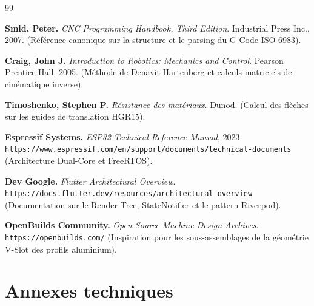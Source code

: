 
\newpage
{}
\begin{thebibliography}{99}

\textbf{Smid, Peter.} \textit{CNC Programming Handbook, Third Edition}. Industrial Press Inc., 2007. \newline
(Référence canonique sur la structure et le parsing du G-Code ISO 6983).

\textbf{Craig, John J.} \textit{Introduction to Robotics: Mechanics and Control}. Pearson Prentice Hall, 2005. \newline
(Méthode de Denavit-Hartenberg et calculs matriciels de cinématique inverse).

\textbf{Timoshenko, Stephen P.} \textit{Résistance des matériaux}. Dunod. \newline
(Calcul des flèches sur les guides de translation HGR15).

\textbf{Espressif Systems.} \textit{ESP32 Technical Reference Manual}, 2023. \newline
\texttt{https://www.espressif.com/en/support/documents/technical-documents} \newline
(Architecture Dual-Core et FreeRTOS).

\textbf{Dev Google.} \textit{Flutter Architectural Overview}. \newline
\texttt{https://docs.flutter.dev/resources/architectural-overview} \newline
(Documentation sur le Render Tree, StateNotifier et le pattern Riverpod).

\textbf{OpenBuilds Community.} \textit{Open Source Machine Design Archives}. \newline
\texttt{https://openbuilds.com/} \newline
(Inspiration pour les sous-assemblages de la géométrie V-Slot des profils aluminium).

\end{thebibliography}

\newpage
\appendix
\chapter{Annexes techniques}

